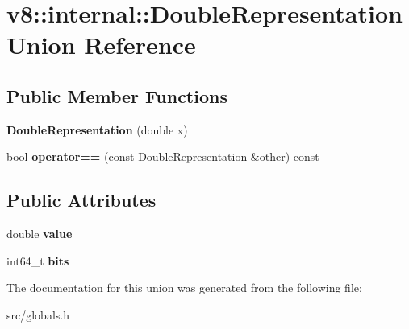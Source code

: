 \hypertarget{unionv8_1_1internal_1_1_double_representation}{}\section{v8\+:\+:internal\+:\+:Double\+Representation Union Reference}
\label{unionv8_1_1internal_1_1_double_representation}
\subsection*{Public Member Functions}
\begin{DoxyCompactItemize}
\item 
\hypertarget{unionv8_1_1internal_1_1_double_representation_a3f7fee6e49a095f811723cdfc720fa78}{}{\bfseries Double\+Representation} (double x)\label{unionv8_1_1internal_1_1_double_representation_a3f7fee6e49a095f811723cdfc720fa78}

\item 
\hypertarget{unionv8_1_1internal_1_1_double_representation_a2a0850fc9ffd822d1c2eae8c6375f26a}{}bool {\bfseries operator==} (const \hyperlink{unionv8_1_1internal_1_1_double_representation}{Double\+Representation} \&other) const \label{unionv8_1_1internal_1_1_double_representation_a2a0850fc9ffd822d1c2eae8c6375f26a}

\end{DoxyCompactItemize}
\subsection*{Public Attributes}
\begin{DoxyCompactItemize}
\item 
\hypertarget{unionv8_1_1internal_1_1_double_representation_a95997c7237a215ff86b1d023eaac3fbc}{}double {\bfseries value}\label{unionv8_1_1internal_1_1_double_representation_a95997c7237a215ff86b1d023eaac3fbc}

\item 
\hypertarget{unionv8_1_1internal_1_1_double_representation_a540b62c358b6661dea96c1769a048bbf}{}int64\+\_\+t {\bfseries bits}\label{unionv8_1_1internal_1_1_double_representation_a540b62c358b6661dea96c1769a048bbf}

\end{DoxyCompactItemize}


The documentation for this union was generated from the following file\+:\begin{DoxyCompactItemize}
\item 
src/globals.\+h\end{DoxyCompactItemize}
